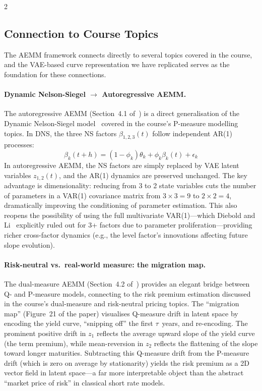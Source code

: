 \documentclass[10pt,a4paper]{article}
\theoremstyle{plain}
\theoremstyle{definition}
\begin{document}
\begin{multicols}{2}
\subsection{Connection to Course Topics}\label{sec:course_topics}

The AEMM framework connects directly to several topics covered in the course, and the VAE-based curve representation we have replicated serves as the foundation for these connections.

\paragraph{Dynamic Nelson-Siegel $\to$ Autoregressive AEMM.} The autoregressive AEMM (Section~4.1 of~\cite{sokol2022}) is a direct generalisation of the Dynamic Nelson-Siegel model~\cite{diebold2006} covered in the course's P-measure modelling topics. In DNS, the three NS factors $\beta_{1,2,3}(t)$ follow independent AR(1) processes:
\begin{equation}
\beta_k(t+h) = (1 - \phi_k)\theta_k + \phi_k \beta_k(t) + \epsilon_k
\end{equation}
In autoregressive AEMM, the NS factors are simply replaced by VAE latent variables $z_{1,2}(t)$, and the AR(1) dynamics are preserved unchanged. The key advantage is dimensionality: reducing from 3 to 2 state variables cuts the number of parameters in a VAR(1) covariance matrix from $3 \times 3 = 9$ to $2 \times 2 = 4$, dramatically improving the conditioning of parameter estimation. This also reopens the possibility of using the full multivariate VAR(1)---which Diebold and Li~\cite{diebold2006} explicitly ruled out for 3+ factors due to parameter proliferation---providing richer cross-factor dynamics (e.g., the level factor's innovations affecting future slope evolution).

\paragraph{Risk-neutral vs.\ real-world measure: the migration map.} The dual-measure AEMM (Section~4.2 of~\cite{sokol2022}) provides an elegant bridge between Q- and P-measure models, connecting to the risk premium estimation discussed in the course's dual-measure and risk-neutral pricing topics. The ``migration map'' (Figure~21 of the paper) visualises Q-measure drift in latent space by encoding the yield curve, ``snipping off'' the first $\tau$~years, and re-encoding. The prominent positive drift in $z_1$ reflects the average upward slope of the yield curve (the term premium), while mean-reversion in $z_2$ reflects the flattening of the slope toward longer maturities. Subtracting this Q-measure drift from the P-measure drift (which is zero on average by stationarity) yields the risk premium as a 2D vector field in latent space---a far more interpretable object than the abstract ``market price of risk'' in classical short rate models.


\end{multicols}
\end{document}
